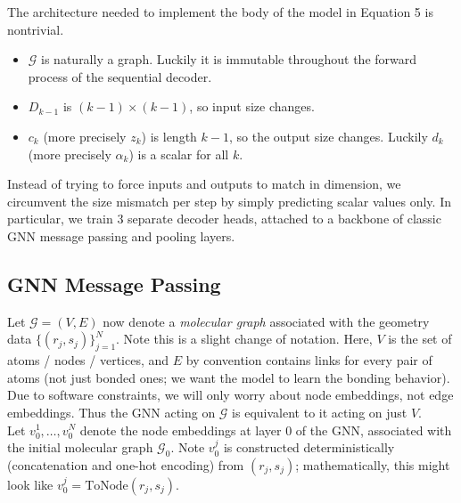 \documentclass[12pt]{article}
\begin{document}
    The architecture needed to implement the body of the model in Equation 5 is nontrivial. 
    \begin{itemize}
        \item $\mathcal{G}$ is naturally a graph. Luckily it is immutable throughout the forward process of the sequential decoder. 
        \item $D_{k-1}$ is $(k-1) \times (k-1)$, so input size changes.
        \item $c_k$ (more precisely $z_k$) is length $k-1$, so the output size changes. Luckily $d_k$ (more precisely $\alpha_k$) is a scalar for all $k$. 
    \end{itemize}

    Instead of trying to force inputs and outputs to match in dimension, we circumvent the size mismatch per step by simply predicting scalar values only. In particular, we train 3 separate decoder heads, attached to a backbone of classic GNN message passing and pooling layers.

    \subsection{GNN Message Passing}
    Let $\mathcal{G} = (V, E)$ now denote a \textit{molecular graph} associated with the geometry data $\{(r_j, s_j)\}_{j=1}^N$. Note this is a slight change of notation. Here, $V$ is the set of atoms / nodes / vertices, and $E$ by convention contains links for every pair of atoms (not just bonded ones; we want the model to learn the bonding behavior). Due to software constraints, we will only worry about node embeddings, not edge embeddings. Thus the GNN acting on $\mathcal{G}$ is equivalent to it acting on just $V$. \\[-6pt] 
    
    Let $v_0^1, \ldots, v_0^N$ denote the node embeddings at layer 0 of the GNN, associated with the initial molecular graph $\mathcal{G}_0$. Note $v_0^j$ is constructed deterministically (concatenation and one-hot encoding) from $(r_j, s_j)$; mathematically, this might look like $v_0^j = \text{ToNode}(r_j, s_j)$. \\[-6pt] 
    
\end{document}
